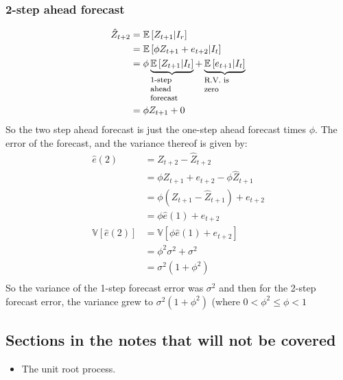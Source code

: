 \subsubsection{2-step ahead forecast}
\begin{equation*}
    \begin{aligned}
        \hat{Z}_{t+2} &= \mathbb{E}\left[Z_{t+1} | I_{r}\right]  \\
                      &= \mathbb{E}\left[\phi Z_{t+1} + e_{t+2} | I_{t}\right]  \\
                      &= \phi \explain{\mathbb{E}\left[Z_{t+1} |
                      I_{t}\right]}{1-step ahead forecast} +
                      \explain{\mathbb{E}\left[e_{t+1} | I_{t}\right] }{ R.V.
                      is zero} \\
                      &= \phi Z_{t+1} + 0 \\
    \end{aligned}
\end{equation*}
So the two step ahead forecast is just the one-step ahead forecast times
$\phi$.
The error of the forecast, and the variance thereof is given by:
\begin{equation*}
    \begin{aligned}
        \hat{e}(2) &= Z_{t+2} - \hat{Z}_{t+2}\\
                   &= \phi Z_{t+1} + e_{t+2} - \phi \hat{Z}_{t+1} \\
                   &= \phi \left( Z_{t+1} - \hat{Z}_{t+1} \right) + e_{t+2} \\
                   &= \phi \hat{e}(1) + e_{t+2} \\
        \mathbb{V}\left[\hat{e}(2)\right]  &= \mathbb{V}\left[\phi \hat{e}(1) + e_{t+2}\right]  \\
                                           &= \phi^{2} \sigma^{2} + \sigma^{2}\\
                                           &= \sigma^{2}(1 + \phi^{2}) \\
    \end{aligned}
\end{equation*}
So the variance of the 1-step forecast error was $\sigma^{2}$ and then for the
2-step forecast error, the variance grew to $\sigma^{2}(1 + \phi^{2})$ (where
$0 < \phi^{2} \le \phi < 1$
       
\subsection{Sections in the notes that will not be covered}
\begin{itemize}
    \item The unit root process.
\end{itemize}

